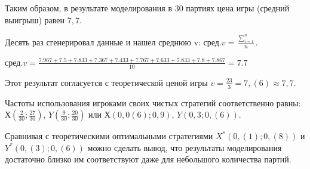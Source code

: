 Таким образом, в результате моделирования в 30 партиях цена игры (средний выигрыш) равен $7,7$.


Десять раз сгенерировал данные и нашел среднюю v: $\text{сред.}v = \frac{\sum^n_{i=1}}{n}$.

$\text{сред.}v = \frac{7.967+7.5+7.833+7.367+7.433+7.767+7.633+7.833+7.8+7.867}{10} = 7.7$

Этот результат согласуется с теоретической ценой игры $v = \frac{23}{3} = 7,(6) \approx 7,7$.

Частоты использования игроками своих чистых стратегий соответственно равны:
$Х(\frac{2}{30}; \frac{27}{30})$, $Y(\frac{9}{30}; \frac{20}{30})$ или
$Х(0,0(6); 0,9)$, $Y(0,3; 0,(6))$.

Сравнивая с теоретическими оптимальными стратегиями $X^*(0,(1); 0,(8))$ и $Y^*(0,(3); 0,(6))$ можно сделать вывод,
что результаты моделирования достаточно близко им соответствуют даже для небольшого количества партий.

